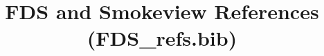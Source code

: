 \documentclass[12pt]{article}
\begin{document}
\nocite{*}
\title{FDS and Smokeview References (FDS\_refs.bib)}
\maketitle

%




\end{document}
